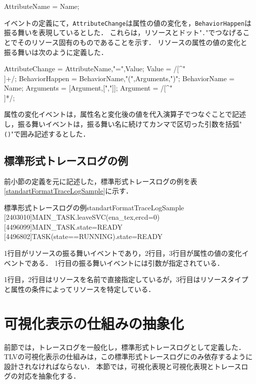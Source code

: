 \begin{EBNF}
AttributeName = Name;
\end{EBNF}

イベントの定義にて，\verb|AttributeChange|は属性の値の変化を，\verb|BehaviorHappen|は振る舞いを表現しているとした．
これらは，リソースとドット"\verb|.|"でつなげることでそのリソース固有のものであることを示す．
リソースの属性の値の変化と振る舞いは次のように定義した．

\begin{EBNF}
AttributeChange = AttributeName,"=",Value;
Value = /[^"\\]+/;
BehaviorHappen =  BehaviorName,"(",Arguments,")";
BehaviorName = Name;
Arguments = [{Argument,[","]}];
Argument = /[^"\\]*/;
\end{EBNF}

属性の変化イベントは，属性名と変化後の値を代入演算子でつなぐことで記述し，振る舞いイベントは，振る舞い名に続けてカンマで区切った引数を括弧"{\tt ()}"で囲み記述するとした．


\subsection{標準形式トレースログの例}

前小節の定義を元に記述した，標準形式トレースログの例を表\ref{standartFormatTraceLogSample}に示す．

\begin{File}{標準形式トレースログの例}{standartFormatTraceLogSample}
[2403010]MAIN_TASK.leaveSVC(ena_tex,ercd=0)
[4496099]MAIN_TASK.state=READY
[4496802]TASK(state==RUNNING).state=READY
\end{File}

1行目がリソースの振る舞いイベントであり，2行目，3行目が属性の値の変化イベントである．
1行目の振る舞いイベントには引数が指定されている．

1行目，2行目はリソースを名前で直接指定しているが，3行目はリソースタイプと属性の条件によってリソースを特定している．

\section{可視化表示の仕組みの抽象化}

前節では，トレースログを一般化し，標準形式トレースログとして定義した．
TLVの可視化表示の仕組みは，この標準形式トレースログにのみ依存するように設計されなければならない．
本節では，可視化表現と可視化表現とトレースログの対応を抽象化する．

